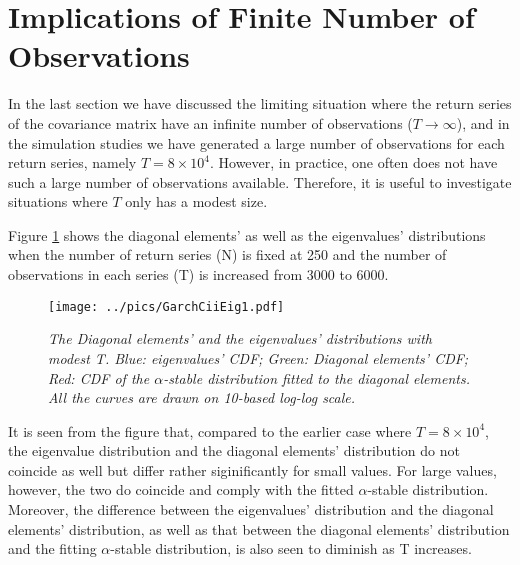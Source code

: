 \documentclass{report}
\begin{document}

\section{Implications of Finite Number of Observations}
In the last section we have discussed the limiting situation where the
return series of the covariance matrix have an infinite number of
observations ($T \to \infty$), and in the simulation studies we have
generated a large number of observations for each return series,
namely $T = 8 \times 10^4$. However, in practice, one often does not
have such a large number of observations available. Therefore, it is
useful to investigate situations where $T$ only has a modest size.

Figure \ref{fig:GarchCiiEig1} shows the diagonal elements' as well as
the eigenvalues' distributions when the number of return series (N) is
fixed at 250 and the number of observations in each series (T) is
increased from 3000 to 6000.
\begin{figure}[htb!]
  \centering
    \texttt{[image: ../pics/GarchCiiEig1.pdf]}
  \caption{\small \it The Diagonal elements' and the eigenvalues'
    distributions with modest T. Blue: eigenvalues' CDF;
    Green: Diagonal elements' CDF; Red: CDF of the $\alpha$-stable
    distribution fitted to the diagonal elements. All the curves are
    drawn on 10-based log-log scale.
  }
  \label{fig:GarchCiiEig1}
\end{figure}
It is seen from the figure that, compared to the earlier case where $T
= 8 \times 10^4$, the eigenvalue distribution and the diagonal
elements' distribution do not coincide as well but differ rather
siginificantly for small values. For large values, however, the two do
coincide and comply with the fitted $\alpha$-stable
distribution. Moreover, the difference between the eigenvalues'
distribution and the diagonal elements' distribution, as well as that
between the diagonal elements' distribution and the fitting
$\alpha$-stable distribution, is also seen to diminish as T
increases.
\end{document}
